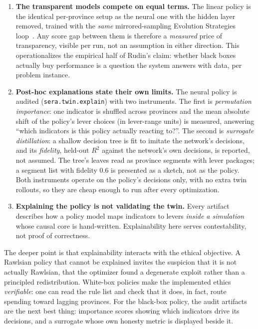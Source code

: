 \documentclass[11pt,a4paper]{article}
\newcommand{\code}[1]{\texttt{#1}}
\begin{document}
\begin{enumerate}
    \item \textbf{The transparent models compete on equal terms.} The linear
    policy is the identical per-province setup as the neural one with the
    hidden layer removed, trained with the \emph{same} mirrored-sampling
    Evolution Strategies loop~\cite{salimans2017}. Any score gap between them
    is therefore a \emph{measured} price of transparency, visible per run,
    not an assumption in either direction. This operationalizes the empirical
    half of Rudin's claim: whether black boxes actually buy performance is a
    question the system answers with data, per problem instance.
    \item \textbf{Post-hoc explanations state their own limits.} The neural
    policy is audited (\code{sera.twin.explain}) with two instruments. The
    first is \emph{permutation importance}: one indicator is shuffled across
    provinces and the mean absolute shift of the policy's lever choices (in
    lever-range units) is measured, answering ``which indicators is this
    policy actually reacting to?''. The second is \emph{surrogate
    distillation}: a shallow decision tree is fit to imitate the network's
    decisions, and its \emph{fidelity}, held-out $R^2$ against the
    network's own decisions, is reported, not assumed. The tree's leaves
    read as province segments with lever packages; a segment list with
    fidelity 0.6 is presented as a sketch, not as the policy. Both instruments
    operate on the policy's decisions only, with no extra twin rollouts, so
    they are cheap enough to run after every optimization.
    \item \textbf{Explaining the policy is not validating the twin.} Every
    artifact describes how a policy model maps indicators to levers
    \emph{inside a simulation} whose causal core is hand-written.
    Explainability here serves contestability, not proof of correctness.
\end{enumerate}

The deeper point is that explainability interacts with the ethical objective.
A Rawlsian policy that cannot be explained invites the suspicion that it is
not actually Rawlsian, that the optimizer found a degenerate exploit rather
than a principled redistribution. White-box policies make the implemented
ethics \emph{verifiable}: one can read the rule list and check that it does,
in fact, route spending toward lagging provinces. For the black-box policy,
the audit artifacts are the next best thing: importance scores showing which
indicators drive its decisions, and a surrogate whose own honesty metric is
displayed beside it.
\end{document}
